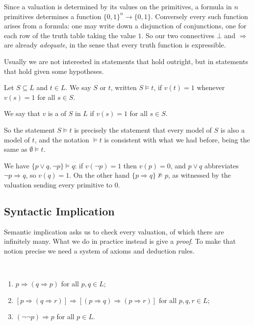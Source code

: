 \documentclass[a4paper]{scrartcl}
\begin{document}
\begin{remark}
  Since a valuation is determined by its values on the primitives, a formula in $n$ primitives determines a function $\{0,1\}^n \to \{0,1\}$. Conversely every such function arises from a formula: one may write down a disjunction of conjunctions, one for each row of the truth table taking the value $1$. So our two connectives $\bot$ and $\Rightarrow$ are already \emph{adequate}, in the sense that every truth function is expressible.
\end{remark}

Usually we are not interested in statements that hold outright, but in statements that hold given some hypotheses.

\begin{definition}
  Let $S \subseteq L$ and $t \in L$. We say $S$  or  $t$, written $S \models t$, if $v(t) = 1$ whenever $v(s) = 1$ for all $s \in S$.
\end{definition}

\begin{definition}[Model]
  We say that $v$ is a  of $S$ in $L$ if $v(s) = 1$ for all $s \in S$.
\end{definition}

So the statement $S \models t$ is precisely the statement that every model of $S$ is also a model of $t$, and the notation $\models t$ is consistent with what we had before, being the same as $\emptyset \models t$.

\begin{example}
  We have $\{p \lor q, \lnot p\} \models q$: if $v(\lnot p) = 1$ then $v(p) = 0$, and $p \lor q$ abbreviates $\lnot p \Rightarrow q$, so $v(q) = 1$. On the other hand $\{p \Rightarrow q\} \not\models p$, as witnessed by the valuation sending every primitive to $0$.
\end{example}

\subsection{Syntactic Implication}

Semantic implication asks us to check every valuation, of which there are infinitely many. What we do in practice instead is give a \emph{proof}. To make that notion precise we need a system of axioms and deduction rules.

\begin{axiom}~
  \begin{enumerate}[label=(\arabic*)]
    \item $p \Rightarrow (q \Rightarrow p)$ for all $p, q \in L$;
    \item $[p \Rightarrow (q \Rightarrow r)] \Rightarrow [(p \Rightarrow q) \Rightarrow (p \Rightarrow r)]$ for all $p, q, r \in L$;
    \item $(\lnot \lnot p) \Rightarrow p$ for all $p \in L$.
  \end{enumerate}
\end{axiom}
\end{document}
